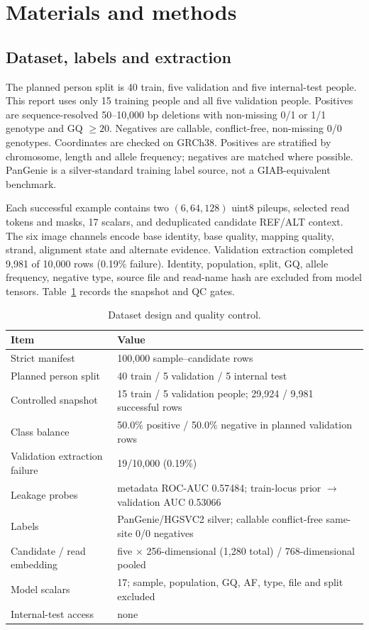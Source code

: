 \documentclass[10pt,twocolumn]{article}
\begin{document}
\section{Materials and methods}
\subsection{Dataset, labels and extraction}
The planned person split is 40 train, five validation and five internal-test people. This report uses only 15 training people and all five validation people. Positives are sequence-resolved 50--10,000 bp deletions with non-missing 0/1 or 1/1 genotype and GQ $\geq20$. Negatives are callable, conflict-free, non-missing 0/0 genotypes. Coordinates are checked on GRCh38. Positives are stratified by chromosome, length and allele frequency; negatives are matched where possible. PanGenie is a silver-standard training label source, not a GIAB-equivalent benchmark.

Each successful example contains two $(6,64,128)$ uint8 pileups, selected read tokens and masks, 17 scalars, and deduplicated candidate REF/ALT context. The six image channels encode base identity, base quality, mapping quality, strand, alignment state and alternate evidence. Validation extraction completed 9,981 of 10,000 rows (0.19\% failure). Identity, population, split, GQ, allele frequency, negative type, source file and read-name hash are excluded from model tensors. Table~\ref{tab:dataset} records the snapshot and QC gates.

\begin{table}[!t]\centering
\caption{Dataset design and quality control.}\label{tab:dataset}\small
\begin{tabular}{ll}\toprule
Item & Value\\\midrule
Strict manifest & 100,000 sample--candidate rows\\
Planned person split & 40 train / 5 validation / 5 internal test\\
Controlled snapshot & 15 train / 5 validation people; 29,924 / 9,981 successful rows\\
Class balance & 50.0\% positive / 50.0\% negative in planned validation rows\\
Validation extraction failure & 19/10,000 (0.19\%)\\
Leakage probes & metadata ROC-AUC 0.57484; train-locus prior $\rightarrow$ validation AUC 0.53066\\
Labels & PanGenie/HGSVC2 silver; callable conflict-free same-site 0/0 negatives\\
Candidate / read embedding & five $\times$ 256-dimensional (1,280 total) / 768-dimensional pooled\\
Model scalars & 17; sample, population, GQ, AF, type, file and split excluded\\
Internal-test access & none\\\bottomrule
\end{tabular}
\end{table}
\end{document}
